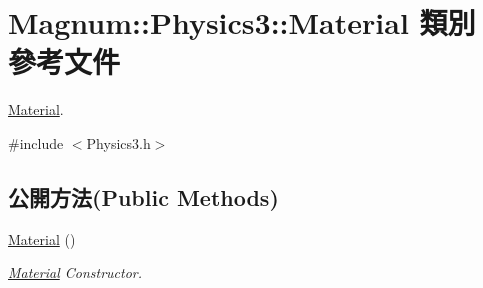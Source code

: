 \hypertarget{class_magnum_1_1_physics3_1_1_material}{}\section{Magnum\+:\+:Physics3\+:\+:Material 類別 參考文件}
\label{class_magnum_1_1_physics3_1_1_material}


\hyperlink{class_magnum_1_1_physics3_1_1_material}{Material}.  




{\ttfamily \#include $<$Physics3.\+h$>$}

\subsection*{公開方法(Public Methods)}
\begin{DoxyCompactItemize}
\item 
\hyperlink{class_magnum_1_1_physics3_1_1_material_aabedb56a1762640b7ed77e8df0b52334}{Material} ()
\begin{DoxyCompactList}\small\item\em \hyperlink{class_magnum_1_1_physics3_1_1_material}{Material} Constructor. \end{DoxyCompactList}\end{DoxyCompactItemize}
